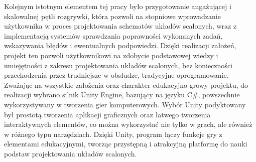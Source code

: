 \indent Kolejnym istotnym elementem tej pracy było przygotowanie angażującej i skalowalnej pętli rozgrywki,
która pozwoli na stopniowe wprowadzanie użytkownika w proces projektowania schematów układów scalonych,
wraz z implementacją systemów sprawdzania poprawności wykonanych zadań, wskazywania błędów i ewentualnych podpowiedzi.
Dzięki realizacji założeń, projekt ten pozwoli użytkownikowi na zdobycie podstawowej wiedzy
i umiejętności z zakresu projektowania układów scalonych,
bez konieczności przechodzenia przez trudniejsze w obsłudze, tradycyjne oprogramowanie.\\
\indent Zważając na wszystkie założenia oraz charakter edukacyjno-growy projektu,
do realizacji wybrano silnik Unity Engine,
bazujący na języku C\#,
powszechnie wykorzystywany w tworzenia gier komputerowych.
Wybór Unity podyktowany był prostotą tworzenia aplikacji graficznych oraz łatwego tworzenia interaktywnych elementów,
co można wykorzystać nie tylko w grach, ale również w różnego typu narzędziach.
Dzięki Unity,
program łączy funkcje gry z elementami edukacyjnymi,
tworząc przystępną i atrakcyjną platformę do nauki podstaw projektowania układów scalonych.
